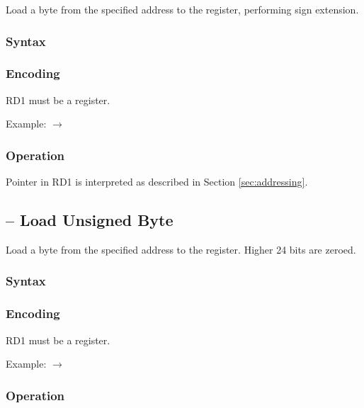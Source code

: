 \documentclass[a4paper,12pt,twoside,extrafontsizes]{memoir}
\begin{document}
{Load a byte from the specified address to the register, performing sign extension.

\subsubsection{Syntax}


\subsubsection{Encoding}


RD1 must be a register.

Example:  $\rightarrow$ 

\subsubsection{Operation}


Pointer in RD1 is interpreted as described in Section \ref{sec:addressing}.

\subsection{ -- Load Unsigned Byte}
\label{subsec:instr:lub}

Load a byte from the specified address to the register. Higher 24 bits are zeroed.

\subsubsection{Syntax}


\subsubsection{Encoding}


RD1 must be a register.

Example:  $\rightarrow$ 

\subsubsection{Operation}

}
\end{document}
